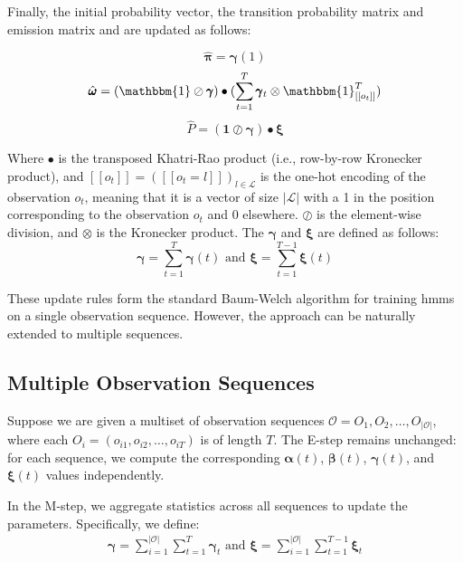Finally, the initial probability vector, the transition probability matrix and emission matrix and are updated as follows:

\begin{equation}
    \hat{\pmb{\pi}} = \pmb{\gamma}(1)
    \label{eq:initial-probabilities-update}
\end{equation}
\begin{equation}
    \hat{\pmb{\omega}} = (\mathbbm{1} \oslash \pmb{\gamma}) \bullet (\sum_{t=1}^{T} \pmb{\gamma}_t \otimes \mathbbm{1}_{[[o_t]]}^{T})
    \label{eq:emission-probabilities-update}
\end{equation}
\begin{equation}
    \hat{P} = (\mathbf{1} \oslash \pmb{\gamma} ) \bullet \pmb{\xi}
    \label{eq:transition-probabilities-update}
\end{equation}

Where $\bullet$ is the transposed Khatri-Rao product (i.e., row-by-row Kronecker product), and $[[o_t]] = ([[o_t=l]])_{l \in \mathcal{L}}$ is the one-hot encoding of the observation $o_t$, meaning that it is a vector of size $|\mathcal{L}|$ with a 1 in the position corresponding to the observation $o_t$ and 0 elsewhere.
$\oslash$ is the element-wise division, and $\otimes$ is the Kronecker product.
The $\pmb{\gamma}$ and $\pmb{\xi}$ are defined as follows:
\begin{equation}
    \pmb{\gamma} = \sum_{t=1}^{T} \pmb{\gamma}(t) \text{ and } \pmb{\xi} = \sum_{t=1}^{T-1} \pmb{\xi}(t)
    \label{eq:gamma-xi-definitions}
\end{equation}

These update rules form the standard Baum-Welch algorithm for training \glspl{hmm} on a single observation sequence.
However, the approach can be naturally extended to multiple sequences.

\subsection{Multiple Observation Sequences}\label{subsec:multiple-observation-sequences}
Suppose we are given a multiset of observation sequences $\mathcal{O} = {O_1, O_2, \ldots, O_{|\mathcal{O}|}}$, where each $O_i = (o_{i1}, o_{i2}, \ldots, o_{iT})$ is of length $T$.
The E-step remains unchanged: for each sequence, we compute the corresponding $\pmb{\alpha}(t)$, $\pmb{\beta}(t)$, $\pmb{\gamma}(t)$, and $\pmb{\xi}(t)$ values independently.

In the M-step, we aggregate statistics across all sequences to update the parameters.
Specifically, we define:
\begin{align}
    \pmb{\gamma} = \sum_{i=1}^{|\mathcal{O}|}\sum_{t=1}^{T} \pmb{\gamma}_t
    \text{ and }
    \pmb{\xi} = \sum_{i=1}^{|\mathcal{O}|}\sum_{t=1}^{T-1} \pmb{\xi}_t
\end{align}


